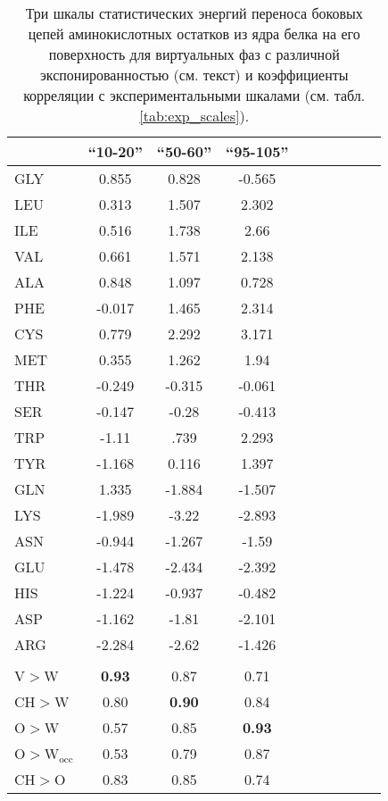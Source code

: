 \begin{table}
\caption{\label{tab:stat_scales} Три шкалы статистических энергий переноса боковых цепей аминокислотных остатков из ядра белка на его поверхность для виртуальных фаз с различной экспонированностью (см. текст) и коэффициенты корреляции с экспериментальными шкалами (см. табл. \ref{tab:exp_scales}).}

	\begin{tabular}{l|cccccccc|c}
                     & ``10-20'' & ``50-60'' & ``95-105'' \\
	\hline
GLY	&0.855	&0.828	&-0.565 \\
LEU	&0.313	&1.507	&2.302 \\
ILE	&0.516	&1.738	&2.66 \\
VAL	&0.661	&1.571	&2.138 \\
ALA	&0.848	&1.097	&0.728 \\
PHE	&-0.017	&1.465	&2.314 \\
CYS	&0.779	&2.292	&3.171\\
MET	&0.355	&1.262	&1.94\\ 
THR	&-0.249	&-0.315	&-0.061\\
SER	&-0.147	&-0.28	&-0.413\\
TRP	&-1.11	&.739	  &2.293\\
TYR	&-1.168	&0.116	&1.397\\
GLN	&1.335	&-1.884	&-1.507\\
LYS	&-1.989	&-3.22	&-2.893\\
ASN	&-0.944	&-1.267	&-1.59\\
GLU	&-1.478	&-2.434	&-2.392\\
HIS	&-1.224	&-0.937	&-0.482\\
ASP	&-1.162	&-1.81	&-2.101\\
ARG	&-2.284	&-2.62	&-1.426\\
\hline\\
V$>$W& \textbf{0.93} & 0.87  &0.71\\
CH$>$W& 0.80&\textbf{0.90}   &0.84\\
O$>$W&  0.57&0.85   &\textbf{0.93}\\
O$>$W$_{\text{occ}}$& 0.53&0.79&0.87\\
CH$>$O& 0.83&0.85   &0.74
\end{tabular}

	
\end{table}
	 